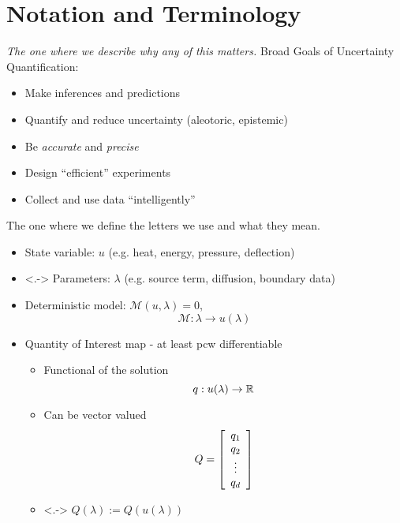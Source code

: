% 


\section{Notation and Terminology}
\begin{frame}[t]{\it The one where we describe why any of this matters.}
\centering
	Broad Goals of Uncertainty Quantification: 
	\vskip 10pt
    \begin{itemize}
	    \item Make inferences and predictions
	    \vskip 20pt
        \item Quantify and reduce uncertainty (aleotoric, epistemic)
	    \vskip 20pt
	    \item Be \emph{accurate} and \emph{precise}
	    \vskip 20pt
	    \item Design ``efficient'' experiments
	    \vskip 20pt
	    \item Collect and use data ``intelligently''
    \end{itemize}
    
\end{frame}

\begin{frame}[t]{The one where we define the letters we use and what they mean.}
\begin{itemize}
	\item State variable: $u$ {\color{gray}(e.g. heat, energy, pressure, deflection)}
	\vskip 10pt
	\item<.-> Parameters: $\lambda$ {\color{gray}(e.g. source term, diffusion, boundary data)}
	\vskip 10pt
		\item Deterministic model: $\mathcal{M} (u, \lambda) = 0$, $$\mathcal{M}:\lambda \to u(\lambda)$$

	\item Quantity of Interest map  - at least pcw differentiable \vskip 5pt
		\begin{itemize}
		\item Functional of the solution $$q: u(\lambda) \to \RR$$
		\item Can be vector valued $$Q = \mat{c}{q_1\\ q_2\\ \vdots \\ q_d}$$
		\item<.-> $Q(\lambda) := Q(u(\lambda))$
	\end{itemize}

\end{itemize}

\end{frame}


